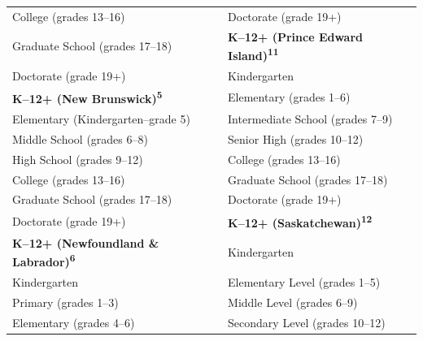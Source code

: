 \documentclass[
]{book}
\theoremstyle{definition}
\theoremstyle{definition}
\theoremstyle{definition}
\theoremstyle{definition}
\theoremstyle{remark}
\begin{document}
\begin{ThreePartTable}
\begin{longtable}[t]{>{}l|l}
\hspace{1em}College (grades 13–16) & \hspace{1em}Doctorate (grade \vphantom{1} 19+)\\
\hspace{1em}Graduate School (grades 17–18) & \textbf{K–12+ (Prince Edward Island)\textsuperscript{11}}\\
\hspace{1em}Doctorate (grade 19+) & \hspace{1em}Kindergarten\\
\textbf{K–12+ (New Brunswick)\textsuperscript{5}} & \hspace{1em}Elementary (grades 1–6)\\
\hspace{1em}Elementary (Kindergarten–grade 5) & \hspace{1em}Intermediate School (grades 7–9)\\
\hspace{1em}Middle School (grades 6–8) & \hspace{1em}Senior High (grades 10–12)\\
\hspace{1em}High School (grades 9–12) & \hspace{1em}College (grades 13–16)\\
\hspace{1em}College (grades 13–16) & \hspace{1em}Graduate School (grades 17–18)\\
\hspace{1em}Graduate School (grades 17–18) & \hspace{1em}Doctorate (grade 19+)\\
\hspace{1em}Doctorate (grade 19+) & \textbf{K–12+ (Saskatchewan)\textsuperscript{12}}\\
\textbf{K–12+ (Newfoundland \& Labrador)\textsuperscript{6}} & \hspace{1em}Kindergarten\\
\hspace{1em}Kindergarten & \hspace{1em}Elementary Level (grades 1–5)\\
\hspace{1em}Primary (grades 1–3) & \hspace{1em}Middle Level (grades 6–9)\\
\hspace{1em}Elementary (grades 4–6) & \hspace{1em}Secondary Level (grades 10–12)\\

\end{longtable}
\end{ThreePartTable}
\end{document}
